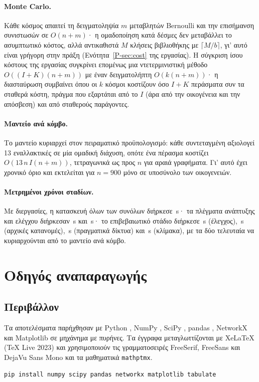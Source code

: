 \documentclass[11pt,a4paper]{article}
\theoremstyle{definition}
\theoremstyle{plain}
\begin{document}
\paragraph{Monte Carlo.} Κάθε κόσμος απαιτεί τη δειγματοληψία $m$ μεταβλητών Bernoulli και την επισήμανση συνιστωσών σε $O(n+m)$· η ομαδοποίηση κατά δέσμες δεν μεταβάλλει το ασυμπτωτικό κόστος, αλλά αντικαθιστά $M$ κλήσεις βιβλιοθήκης με $\lceil M/b\rceil$, γι' αυτό είναι γρήγορη στην πράξη (Ενότητα~\ref*{P-sec:cost} της εργασίας). Η σύγκριση ίσου κόστους της εργασίας συγκρίνει επομένως μια ντετερμινιστική μέθοδο $O((I+K)(n+m))$ με έναν δειγματολήπτη $O(k(n+m))$· η διασταύρωση συμβαίνει όπου οι $k$ κόσμοι κοστίζουν όσο $I+K$ περάσματα συν τα σταθερά κόστη, πράγμα που εξαρτάται από το $I$ (άρα από την οικογένεια και την απόσβεση) και από σταθερούς παράγοντες.

\paragraph{Μαντείο ανά κόμβο.} Το μαντείο κυριαρχεί στον πειραματικό προϋπολογισμό: κάθε συντεταγμένη αξιολογεί 13 εναλλακτικές σε μία ομαδική διάχυση, οπότε ένα πέρασμα κοστίζει $O(13\,n\,I(n+m))$, τετραγωνικά ως προς $n$ για αραιά γραφήματα. Γι' αυτό έχει χρονικό όριο και εκτελείται για $n=900$ μόνο σε υποσύνολο των οικογενειών.

\paragraph{Μετρημένοι χρόνοι σταδίων.} Με \NCores{} διεργασίες, η κατασκευή όλων των συνόλων διήρκεσε \RunBuild\,s· τα πλέγματα ανάπτυξης και ελέγχου διήρκεσαν \RunGridDev\,s και \RunGridTest\,s· το επιβεβαιωτικό στάδιο διήρκεσε \RunConfTest\,s (έλεγχος), \RunConfPrior\,s (αρχικές κατανομές), \RunConfReal\,s (πραγματικά δίκτυα) και \RunConfScale\,s (κλίμακα), με τα δύο τελευταία να κυριαρχούνται από το μαντείο ανά κόμβο.

\section{Οδηγός αναπαραγωγής}\label{sec:repro}

\subsection{Περιβάλλον}

Τα αποτελέσματα παρήχθησαν με Python \PyVersion, NumPy \NpVersion, SciPy \SpVersion, pandas \PdVersion, NetworkX \NxVersion{} και Matplotlib \MplVersion{} σε μηχάνημα με \NCores{} πυρήνες. Τα έγγραφα μεταγλωττίζονται με XeLaTeX (TeX Live 2023) και χρησιμοποιούν τις γραμματοσειρές FreeSerif, FreeSans και DejaVu Sans Mono και τα μαθηματικά \texttt{mathptmx}.
\begin{verbatim}
pip install numpy scipy pandas networkx matplotlib tabulate
\end{verbatim}
\end{document}
